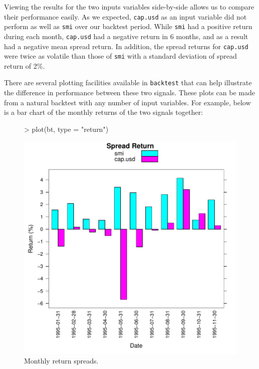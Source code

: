 \documentclass[a4paper]{report}
\begin{document}
\begin{article}
Viewing the results for the two inputs variables side-by-side allows
us to compare their performance easily.  As we expected,
\texttt{cap.usd} as an input variable did not perform as well as
\texttt{smi} over our backtest period.  While \texttt{smi} had a
positive return during each month, \texttt{cap.usd} had a negative
return in 6 months, and as a result had a negative mean spread return.
In addition, the spread returns for \texttt{cap.usd} were twice as
volatile than those of \texttt{smi} with a standard deviation of
spread return of 2\%.

There are several plotting facilities available in \texttt{backtest}
that can help illustrate the difference in performance between these
two signals.  These plots can be made from a natural backtest with any
number of input variables.  For example, below is a bar chart of the
monthly returns of the two signals together:

\begin{figure}
\centering
\vspace*{.1in}
\begin{Schunk}
\begin{Sinput}
> plot(bt, type = "return")
\end{Sinput}
\end{Schunk}
\includegraphics{backtest-020}
\caption{\label{figure:return}
Monthly return spreads.}
\end{figure}


\end{article}
\end{document}
